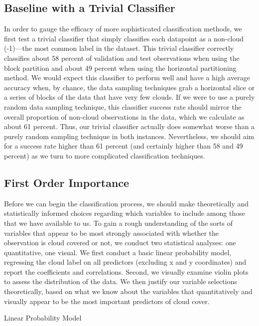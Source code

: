 \documentclass[12pt]{article}
\begin{document}
\subsection{Baseline with a Trivial Classifier}
In order to gauge the efficacy of more sophisticated classification methods, we first test a trivial classifier that simply classifies each datapoint as a non-cloud (-1)---the most common label in the dataset.  This trivial classifier correctly classifies about 58 percent of validation and test observations when using the block partition and about 49 percent when using the horizontal partitioning method. We would expect this classifier to perform well and have a high average accuracy when, by chance, the data sampling techniques grab a horizontal slice or a series of blocks of the data that have very few clouds. If we were to use a purely random data sampling technique, this classifier success rate should mirror the overall proportion of non-cloud observations in the data, which we calculate as about 61 percent. Thus, our trivial classifier actually does somewhat worse than a purely random sampling technique in both instances. Nevertheless, we should aim for a success rate higher than 61 percent (and certainly higher than 58 and 49 percent) as we turn to more complicated classification techniques.    

\subsection{First Order Importance}
Before we can begin the classification process, we should make theoretically and statistically informed choices regarding which variables to include among those that we have available to us. To gain a rough understanding of the sorts of variables that appear to be most strongly associated with whether the observation is cloud covered or not, we conduct two statistical analyses: one quantitative, one visual. We first conduct a basic linear probability model, regressing the cloud label on all predictors (excluding x and y coordinates) and report the coefficients and correlations. Second, we visually examine violin plots to assess the distribution of the data. We then justify our variable selections theoretically, based on what we know about the variables that quantitatively and visually appear to be the most important predictors of cloud cover.
\newline
\begin{table}[htp!]
    \centering
    \caption{Linear Probability Model}
   
\end{table}
\end{document}
